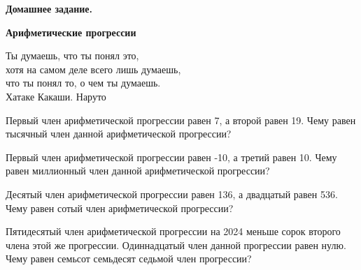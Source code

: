 \hspace{3mm}

\centerline{\bf \Huge Домашнее задание.}
\centerline{\bf \Huge Арифметические прогрессии}

\begin{flushright}
    \scriptsize{Ты думаешь, что ты понял это, \\хотя на самом деле всего лишь думаешь,\\ что ты понял то, о чем ты думаешь. \\Хатаке Какаши. Наруто}
\end{flushright}

 Первый член арифметической прогрессии равен 7, а второй равен 19. Чему равен тысячный член данной арифметической прогрессии?

 Первый член арифметической прогрессии равен -10, а третий равен 10. Чему равен миллионный член данной арифметической прогрессии?

 Десятый член арифметической прогрессии равен 136, а двадцатый равен 536. Чему равен сотый член арифметической прогрессии?

 Пятидесятый член арифметической прогрессии на 2024 меньше сорок второго члена этой же прогрессии. Одиннадцатый член данной прогрессии равен нулю. Чему равен семьсот семьдесят седьмой член прогрессии?